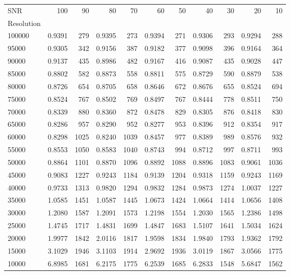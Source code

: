 \documentclass[referee]{aa}
\begin{document}
\begin{table}[]
\begin{center}
{{\begin{tabular}{l r r r r r r r r r r}
\hline
\hline
SNR & 100 & 90 & 80 & 70 & 60 & 50 & 40 & 30 & 20 & 10 \\
Resolution & & &    &    &    &    &    &    &    &    \\
\hline
100000 & 0.9391 & 279 & 0.9395 & 273 & 0.9394 & 271 & 0.9306 & 293 & 0.9294 & 288 \\
95000 & 0.9305 & 342 & 0.9156 & 387 & 0.9182 & 377 & 0.9098 & 396 & 0.9164 & 364 \\
90000 & 0.9137 & 435 & 0.8986 & 482 & 0.9167 & 416 & 0.9087 & 435 & 0.9028 & 447 \\
85000 & 0.8802 & 582 & 0.8873 & 558 & 0.8811 & 575 & 0.8729 & 590 & 0.8879 & 538 \\
80000 & 0.8726 & 654 & 0.8705 & 658 & 0.8646 & 672 & 0.8676 & 655 & 0.8524 & 694 \\
75000 & 0.8524 & 767 & 0.8502 & 769 & 0.8497 & 767 & 0.8444 & 778 & 0.8511 & 750 \\
70000 & 0.8339 & 880 & 0.8360 & 872 & 0.8478 & 829 & 0.8305 & 876 & 0.8418 & 830 \\
65000 & 0.8286 & 957 & 0.8290 & 952 & 0.8277 & 953 & 0.8396 & 912 & 0.8354 & 917 \\
60000 & 0.8298 & 1025 & 0.8240 & 1039 & 0.8457 & 977 & 0.8389 & 989 & 0.8576 & 932 \\
55000 & 0.8553 & 1050 & 0.8583 & 1040 & 0.8743 & 994 & 0.8712 & 997 & 0.8711 & 993 \\
50000 & 0.8864 & 1101 & 0.8870 & 1096 & 0.8892 & 1088 & 0.8896 & 1083 & 0.9061 & 1036 \\
45000 & 0.9083 & 1227 & 0.9243 & 1184 & 0.9139 & 1204 & 0.9318 & 1159 & 0.9243 & 1169 \\
40000 & 0.9733 & 1313 & 0.9820 & 1294 & 0.9832 & 1284 & 0.9873 & 1274 & 1.0037 & 1227 \\
35000 & 1.0585 & 1451 & 1.0587 & 1445 & 1.0673 & 1424 & 1.0664 & 1414 & 1.0656 & 1408 \\
30000 & 1.2080 & 1587 & 1.2091 & 1573 & 1.2198 & 1554 & 1.2030 & 1565 & 1.2386 & 1498 \\
25000 & 1.4745 & 1717 & 1.4831 & 1699 & 1.4847 & 1683 & 1.5107 & 1641 & 1.5034 & 1624 \\
20000 & 1.9977 & 1842 & 2.0116 & 1817 & 1.9598 & 1834 & 1.9840 & 1793 & 1.9362 & 1792 \\
15000 & 3.1029 & 1946 & 3.1103 & 1914 & 2.9692 & 1936 & 3.0119 & 1867 & 3.0566 & 1775 \\
10000 & 6.8985 & 1681 & 6.2175 & 1775 & 6.2539 & 1685 & 6.2833 & 1548 & 5.6847 & 1562 \\

\end{tabular}}}
\end{center}
\end{table}
\end{document}
